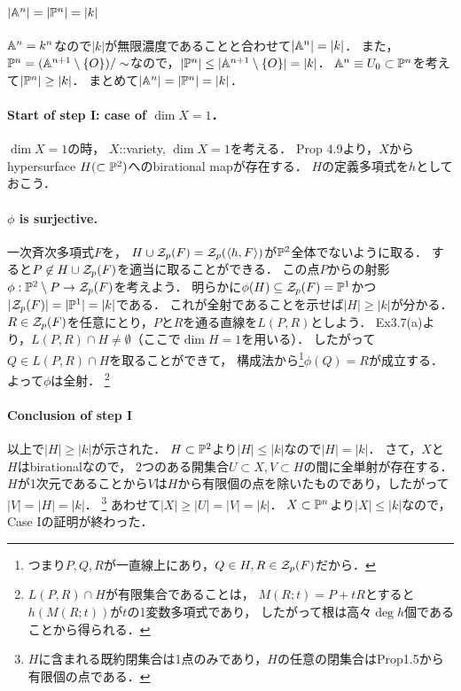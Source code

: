 \documentclass[a4paper]{jsarticle}
\begin{document}
    \paragraph{$|\mathbb{A}^n|=|\mathbb{P}^n|=|k|$}
    $\mathbb{A}^n=k^n$なので$|k|$が無限濃度であることと合わせて$|\mathbb{A}^n|=|k|$．
    また，$\mathbb{P}^n=(\mathbb{A}^{n+1} \setminus \{O\})/\sim$なので，$|\mathbb{P}^n| \leq |\mathbb{A}^{n+1} \setminus \{O\}|=|k|$．
    $\mathbb{A}^n \equiv U_0 \subset \mathbb{P}^n$を考えて$|\mathbb{P}^n| \geq |k|$．
    まとめて$|\mathbb{A}^n|=|\mathbb{P}^n|=|k|$．

    \paragraph{Start of step I: case of $\dim X=1$．}
    $\dim X=1$の時，
    $X$::variety, $\dim X=1$を考える．
    Prop 4.9より，$X$からhypersurface $H (\subset \mathbb{P}^{2})$へのbirational mapが存在する．
    $H$の定義多項式を$h$としておこう．

    \paragraph{$\phi$ is surjective.}
    一次斉次多項式$F$を，
    $H \cup \mathcal{Z}_p(F)=\mathcal{Z}_p(\langle h, F \rangle)$が$\mathbb{P}^{2}$全体でないように取る．
    すると$P \not \in H \cup \mathcal{Z}_p(F)$を適当に取ることができる．
    この点$P$からの射影$\phi: \mathbb{P}^2 \setminus P \to \mathcal{Z}_p(F)$を考えよう．
    明らかに$\phi(H) \subseteq \mathcal{Z}_p(F)=\mathbb{P}^1$かつ$|\mathcal{Z}_p(F)|=|\mathbb{P}^1|=|k|$である．
    これが全射であることを示せば$|H| \geq |k|$が分かる．
    $R \in \mathcal{Z}_p(F)$を任意にとり，$P$と$R$を通る直線を$L(P,R)$としよう．
    Ex3.7(a)より，$L(P,R) \cap H \neq \emptyset$（ここで$\dim H=1$を用いる）．
    したがって$Q \in L(P,R) \cap H$を取ることができて，
    構成法から\footnote{つまり$P,Q,R$が一直線上にあり，$Q \in H, R \in \mathcal{Z}_p(F)$だから．}$\phi(Q)=R$が成立する．
    よって$\phi$は全射．
    \footnote{$L(P,R) \cap H$が有限集合であることは，
    $M(R;t)=P+tR$とすると$h(M(R;t))$が$t$の1変数多項式であり，
    したがって根は高々$\deg h$個であることから得られる．}

    \paragraph{Conclusion of step I}
    以上で$|H| \geq |k|$が示された．
    $H \subset \mathbb{P}^2$より$|H| \leq |k|$なので$|H|=|k|$．
    さて，$X$と$H$はbirationalなので，
    2つのある開集合$U \subset X, V \subset H$の間に全単射が存在する．
    $H$が1次元であることから$V$は$H$から有限個の点を除いたものであり，したがって$|V|=|H|=|k|$．
    \footnote{$H$に含まれる既約閉集合は1点のみであり，$H$の任意の閉集合はProp1.5から有限個の点である．}
    あわせて$|X| \geq |U|=|V|=|k|$．
    $X \subset \mathbb{P}^n$より$|X| \leq |k|$なので，Case Iの証明が終わった．
\end{document}
